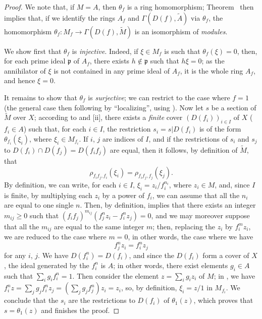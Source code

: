 \begin{proof}
We note that, if $M=A$, then $\theta_f$ is a ring homomorphism;
Theorem~ then implies that, if we identify the rings $A_f$ and $\Gamma(D(f),\widetilde{A})$ via $\theta_f$, the homomorphism $\theta_f:M_f\to\Gamma(D(f),\widetilde{M})$ is an isomorphism of \emph{modules}.

We show first that $\theta_f$ is \emph{injective}.
Indeed, if $\xi\in M_f$ is such that $\theta_f(\xi)=0$, then, for each prime ideal $\mathfrak{p}$ of $A_f$, there exists $h\not\in\mathfrak{p}$ such that $h\xi=0$;
as the annihilator of $\xi$ is not contained in any prime ideal of $A_f$, it is the whole ring $A_f$, and hence $\xi=0$.

It remains to show that $\theta_f$ is \emph{surjective};
we can restrict to the case where $f=1$ (the general case then following by ``localizing'', using ).
Now let $s$ be a section of $\widetilde{M}$ over $X$;
according to  and [ii], there exists a \emph{finite} cover $(D(f_i))_{i\in I}$ of $X$ ($f_i\in A$) such that, for each $i\in I$, the restriction $s_i=s|D(f_i)$ is of the form $\theta_{f_i}(\xi_i)$, where $\xi_i\in M_{f_i}$.
If $i$, $j$ are indices of $I$, and if the restrictions of $s_i$ and $s_j$ to $D(f_i)\cap D(f_j)=D(f_i f_j)$ are equal, then it follows, by definition of $\widetilde{M}$, that
\[
  \label{I.1.3.7.1}
  \rho_{f_i f_j,f_i}(\xi_i)=\rho_{f_i f_j,f_j}(\xi_j).
  \tag{1.3.7.1}
\]
By definition, we can write, for each $i\in I$, $\xi_i=z_i/f_i^{n_i}$, where $z_i\in M$, and, since $I$ is finite, by multiplying each $z_i$ by a power of $f_i$, we can assume that all the $n_i$ are equal to one single $n$.
Then, by definition,  implies that there exists an integer $m_{ij}\geq 0$ such that $(f_i f_j)^{m_{ij}}(f_j^n z_i-f_i^n z_j)=0$, and we may moreover suppose that all the $m_{ij}$ are equal to the same integer $m$;
then, replacing the $z_i$ by $f_i^m z_i$, we are reduced to the case where $m=0$, in other words, the case where we have
\[
  \label{I.1.3.7.2}
  f_j^n z_i=f_i^n z_j
  \tag{1.3.7.2}
\]
for any $i$, $j$.
We have $D(f_i^n)=D(f_i)$, and since the $D(f_i)$ form a cover of $X$, the ideal generated by the $f_i^n$ is $A$;
in other words, there exist elements $g_i\in A$ such that $\sum_i g_i f_i^n=1$.
Then consider the element $z=\sum_i g_i z_i$ of $M$;
in , we have $f_i^n z=\sum_j g_j f_i^n z_j=(\sum_j g_j f_j^n)z_i=z_i$, so, by definition, $\xi_i=z/1$ in $M_{f_i}$.
We conclude
that the $s_i$ are the restrictions to $D(f_i)$ of $\theta_1(z)$, which proves that $s=\theta_1(z)$ and finishes the proof.
\end{proof}

